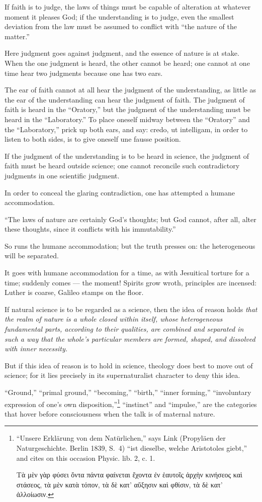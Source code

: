 \documentclass[12pt,a4paper]{article}
\begin{document}
If faith is to judge, the laws of things must be capable of alteration at whatever
moment it pleases God; if the understanding is to judge, even the smallest
deviation from the law must be assumed to conflict with ``the nature of the
matter.''

Here judgment goes against judgment, and the essence of nature is at stake. When
the one judgment is heard, the other cannot be heard; one cannot at one time hear
two judgments because one has two ears.

The ear of faith cannot at all hear the judgment of the understanding, as little as
the ear of the understanding can hear the judgment of faith. The judgment of faith
is heard in the ``Oratory,'' but the judgment of the understanding must be heard in
the ``Laboratory.'' To place oneself midway between the ``Oratory'' and the
``Laboratory,'' prick up both ears, and say: credo, ut intelligam, in order to
listen to both sides, is to give oneself une fausse position.

If the judgment of the understanding is to be heard in science, the judgment of
faith must be heard outside science; one cannot reconcile such contradictory
judgments in one scientific judgment.

In order to conceal the glaring contradiction, one has attempted a humane
accommodation.

``The laws of nature are certainly God's thoughts; but God cannot, after all, alter
these thoughts, since it conflicts with his immutability.''

So runs the humane accommodation; but the truth presses on: the heterogeneous will
be separated.

It goes with humane accommodation for a time, as with Jesuitical
torture for a time; suddenly comes --- the moment! Spirits grow wroth, principles
are incensed: Luther is coarse, Galileo stamps on the floor.

If natural science is to be regarded as a science, then the idea of reason holds
\emph{that the realm of nature is a whole closed within itself, whose heterogeneous
fundamental parts, according to their qualities, are combined and separated in such
a way that the whole's particular members are formed, shaped, and dissolved with
inner necessity.}

But if this idea of reason is to hold in science, theology does best to move out of
science; for it lies precisely in its supernaturalist character to deny this idea.

``Ground,'' ``primal ground,'' ``becoming,'' ``birth,'' ``inner forming,''
``involuntary expression of one's own disposition,''\footnote{``Unsere Erklärung
von dem Natürlichen,'' says Link (Propyläen der Naturgeschichte. Berlin 1839, S.~4)
``ist dieselbe, welche Aristotoles giebt,'' and cites on this occasion Physic. lib.
2, c. 1.

Τὰ μὲν γὰρ φύσει ὄντα πάντα φαίνεται ἔχοντα ἐν ἑαυτοῖς ἀρχὴν κινήσεος καὶ στάσεος,
τὰ μὲν κατὰ τόπον, τὰ δὲ κατ' αὔξησιν καὶ φθίσιν, τὰ δὲ κατ' ἀλλοίωσιν.} ``instinct''
and ``impulse,'' are the categories that hover before consciousness when the talk
is of maternal nature.
\end{document}
